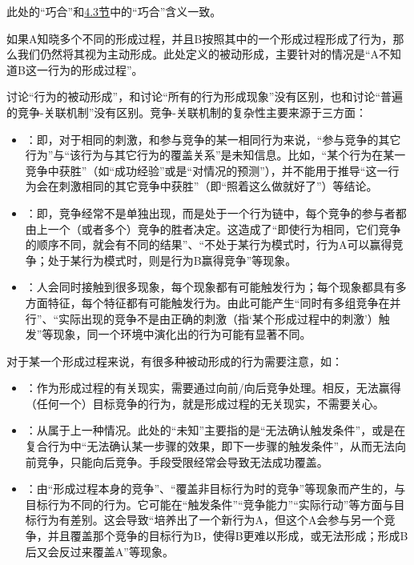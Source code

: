 \begin{explain}
此处的“巧合”和\hyperref[sec:巧合有效的沟通]{4.3节}中的“巧合”含义一致。

如果A知晓多个不同的形成过程，并且B按照其中的一个形成过程形成了行为，那么我们仍然将其视为主动形成。此处定义的被动形成，主要针对的情况是“A不知道B这一行为的形成过程”。

讨论“行为的被动形成”，和讨论“所有的行为形成现象”没有区别，也和讨论“普遍的竞争-关联机制”没有区别。竞争-关联机制的复杂性主要来源于三方面：
\begin{itemize}
\item {}：即，对于相同的刺激，和参与竞争的某一相同行为来说，“参与竞争的其它行为”与“该行为与其它行为的覆盖关系”是未知信息。比如，“某个行为在某一竞争中获胜”（如“成功经验”或是“对情况的预测”），并不能用于推导“这一行为会在刺激相同的其它竞争中获胜”（即“照着这么做就好了”）等结论。
\item {}：即，竞争经常不是单独出现，而是处于一个行为链中，每个竞争的参与者都由上一个（或者多个）竞争的胜者决定。这造成了“即使行为相同，它们竞争的顺序不同，就会有不同的结果”、“不处于某行为模式时，行为A可以赢得竞争；处于某行为模式时，则是行为B赢得竞争”等现象。
\item {}：人会同时接触到很多现象，每个现象都有可能触发行为；每个现象都具有多方面特征，每个特征都有可能触发行为。由此可能产生“同时有多组竞争在并行”、“实际出现的竞争不是由正确的刺激（指‘某个形成过程中的刺激’）触发”等现象，同一个环境中演化出的行为可能有显著不同。
\end{itemize}
对于某一个形成过程来说，有很多种被动形成的行为需要注意，如：
\begin{itemize}
\item {}：作为形成过程的有关现实，需要通过向前/向后竞争处理。相反，无法赢得（任何一个）目标竞争的行为，就是形成过程的无关现实，不需要关心。
\item {}：从属于上一种情况。此处的“未知”主要指的是“无法确认触发条件”，或是在复合行为中“无法确认某一步骤的效果，即下一步骤的触发条件”，从而无法向前竞争，只能向后竞争。手段受限经常会导致无法成功覆盖。
\item {}：由“形成过程本身的竞争”、“覆盖非目标行为时的竞争”等现象而产生的，与目标行为不同的行为。它可能在“触发条件”“竞争能力”“实际行动”等方面与目标行为有差别。这会导致“培养出了一个新行为A，但这个A会参与另一个竞争，并且覆盖那个竞争的目标行为B，使得B更难以形成，或无法形成；形成B后又会反过来覆盖A”等现象。
\end{itemize}
\insertparanotes
\end{explain}


